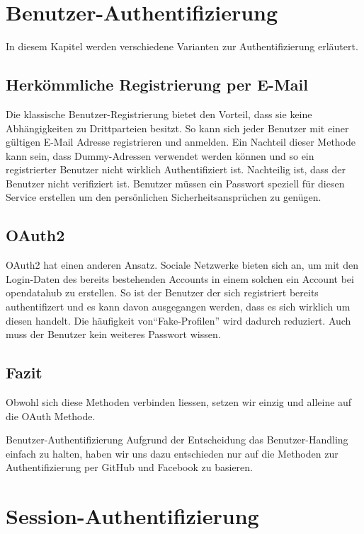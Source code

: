 \section{Benutzer-Authentifizierung}

In diesem Kapitel werden verschiedene Varianten zur Authentifizierung erläutert.

\subsection{Herkömmliche Registrierung per E-Mail}
Die klassische Benutzer-Registrierung bietet den Vorteil, dass sie keine Abhängigkeiten zu Drittparteien besitzt. So kann sich jeder Benutzer mit einer gültigen E-Mail Adresse registrieren und anmelden. Ein Nachteil dieser Methode kann sein, dass Dummy-Adressen verwendet werden können und so ein registrierter Benutzer nicht wirklich Authentifiziert ist. Nachteilig ist, dass der Benutzer nicht verifiziert ist. Benutzer müssen ein Passwort speziell für diesen Service erstellen um den persönlichen Sicherheitsansprüchen zu genügen.

\subsection{OAuth2}

OAuth2 hat einen anderen Ansatz. Sociale Netzwerke bieten sich an, um mit den Login-Daten des bereits bestehenden Accounts in einem solchen ein Account bei opendatahub zu erstellen. So ist der Benutzer der sich registriert bereits authentifizert und es kann davon ausgegangen werden, dass es sich wirklich um diesen handelt. Die häufigkeit von``Fake-Profilen'' wird dadurch reduziert. Auch muss der Benutzer kein weiteres Passwort wissen.

\subsection{Fazit}
Obwohl sich diese Methoden verbinden liessen, setzen wir einzig und alleine auf die OAuth Methode.
\begin{decision}{Benutzer-Authentifizierung}
Aufgrund der Entscheidung das Benutzer-Handling einfach zu halten, haben wir uns dazu entschieden nur auf die Methoden zur Authentifizierung per GitHub und Facebook zu basieren.
\end{decision}

\section{Session-Authentifizierung}

